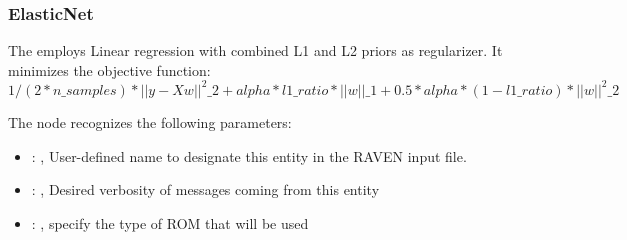 \subsubsection{ElasticNet}
  The  employs                         Linear regression with combined L1 and L2
  priors as regularizer.                         It minimizes the objective function:
  \begin{equation}                         1/(2*n\_{samples}) *||y - Xw||^2\_2+alpha*l1\_ratio*||w||\_1
  + 0.5 *alpha*(1 - l1\_ratio)*||w||^2\_2                         \end{equation}

  The  node recognizes the following parameters:
    \begin{itemize}
      \item {}: , 
        User-defined name to designate this entity in the RAVEN input file.
      \item {}: , 
        Desired verbosity of messages coming from this entity
      \item {}: , 
        specify the type of ROM that will be used
  \end{itemize}

